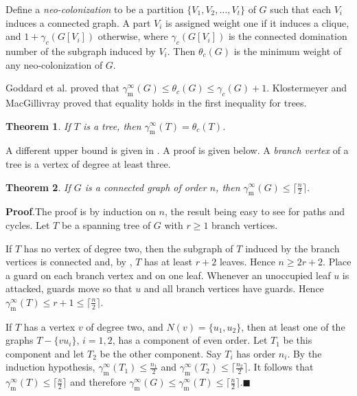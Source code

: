 \documentclass[12pt]{article}%
\newtheorem{theorem}{Theorem}[section]
\begin{document}
Define a \textit{neo-colonization} to be a partition $\{V_{1},V_{2}%
,\ldots,V_{t}\}$ of $G$ such that each $V_{i}$ induces a connected graph. A
part $V_{i}$ is assigned weight one if it induces a clique, and $1+\gamma
_{c}(G[V_{i}])$ otherwise, where $\gamma_{c}(G[V_{i}])$ is the connected
domination number of the subgraph induced by $V_{i}$. Then $\theta_{c}(G)$ is
the minimum weight of any neo-colonization of $G$.

Goddard et al. \cite{GHH} proved that $\gamma_{\mathrm{m}}^{\infty}%
(G)\leq\theta_{c}(G)\leq\gamma_{c}(G)+1$. Klostermeyer and MacGillivray
\cite{KM2} proved that equality holds in the first inequality for trees.

\begin{theorem}
\emph{\cite{KM2}}\hspace{0.1in}If $T$ is a tree, then $\gamma_{\mathrm{m}%
}^{\infty}(T)=\theta_{c}(T)$.
\end{theorem}

A different upper bound is given in \cite{prince2}. A proof is given below. A
\emph{branch vertex }of a tree\emph{ }is a vertex of degree at least three.

\begin{theorem}
\label{princeupper}\hspace{0.1in}If $G$ is a connected graph of order $n$,
then $\gamma_{\mathrm{m}}^{\infty}(G)\leq\lceil\frac{n}{2}\rceil$.
\end{theorem}

\noindent\textbf{Proof}.\hspace{0.1in}The proof is by induction on $n$, the
result being easy to see for paths and cycles. Let $T$ be a spanning tree of
$G$ with $r\geq1$ branch vertices.

If $T$ has no vertex of degree two, then the subgraph of $T$ induced by the
branch vertices is connected and, by \cite[Theorem 3.7]{CL}, $T$ has at least
$r+2$ leaves. Hence $n\geq2r+2$. Place a guard on each branch vertex and on
one leaf. Whenever an unoccupied leaf $u$ is attacked, guards move so that $u$
and all branch vertices have guards. Hence $\gamma_{\mathrm{m}}^{\infty
}(T)\leq r+1\leq\lceil\frac{n}{2}\rceil$.

If $T$ has a vertex $v$ of degree two, and $N(v)=\{u_{1},u_{2}\}$, then at
least one of the graphs $T-\{vu_{i}\}$, $i=1,2$, has a component of even
order. Let $T_{1}$ be this component and let $T_{2}$ be the other component.
Say $T_{i}$ has order $n_{i}$. By the induction hypothesis, $\gamma
_{\mathrm{m}}^{\infty}(T_{1})\leq\frac{n_{1}}{2}$ and $\gamma_{\mathrm{m}%
}^{\infty}(T_{2})\leq\lceil\frac{n_{2}}{2}\rceil$. It follows that
$\gamma_{\mathrm{m}}^{\infty}(T)\leq\lceil\frac{n}{2}\rceil$ and therefore
$\gamma_{\mathrm{m}}^{\infty}(G)\leq\gamma_{\mathrm{m}}^{\infty}(T)\leq
\lceil\frac{n}{2}\rceil$.\hfill$\blacksquare$
\end{document}
